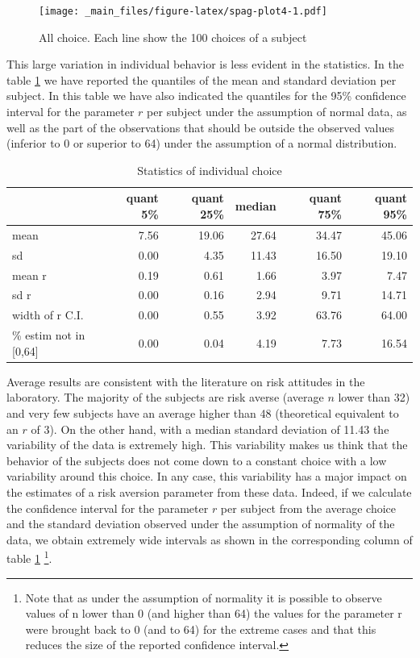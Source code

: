 \documentclass[
]{book}
\begin{document}
\begin{figure}
\centering
\texttt{[image: \_main\_files/figure-latex/spag-plot4-1.pdf]}
\caption{\label{fig:spag-plot4}All choice. Each line show the 100 choices of a subject}
\end{figure}

This large variation in individual behavior is less evident in the
statistics.
In the table \ref{tab:sum-stat-table4} we have reported the
quantiles of the mean and standard deviation per subject.
In this table we have also indicated the quantiles for the 95\% confidence
interval for the parameter \(r\) per subject under the assumption of normal data,
as well as the part of the observations that should be outside the observed
values (inferior to 0 or superior to 64) under the assumption of a normal
distribution.

\begin{table}

\caption{\label{tab:sum-stat-table4}Statistics of individual choice}
\centering
\begin{tabular}[t]{l|r|r|r|r|r}
\hline
  & quant 5\% & quant 25\% & median & quant 75\% & quant 95\%\\
\hline
mean & 7.56 & 19.06 & 27.64 & 34.47 & 45.06\\
\hline
sd & 0.00 & 4.35 & 11.43 & 16.50 & 19.10\\
\hline
mean r & 0.19 & 0.61 & 1.66 & 3.97 & 7.47\\
\hline
sd r & 0.00 & 0.16 & 2.94 & 9.71 & 14.71\\
\hline
width of r C.I. & 0.00 & 0.55 & 3.92 & 63.76 & 64.00\\
\hline
\% estim not in [0,64] & 0.00 & 0.04 & 4.19 & 7.73 & 16.54\\
\hline
\end{tabular}
\end{table}

Average results are consistent with
the literature on risk attitudes in the laboratory. The majority of the subjects
are risk averse (average \(n\) lower than 32) and very few subjects have an
average higher than 48 (theoretical equivalent to an \(r\) of 3). On the
other hand, with a median standard deviation of
11.43 the variability of the data is
extremely high. This variability makes us think that the behavior of the
subjects does not come down to a constant choice with a low variability
around this choice. In any case, this variability has a major impact on
the estimates of a risk aversion parameter from these data. Indeed, if we
calculate the confidence interval for the parameter \(r\) per subject from
the average choice and the standard deviation observed under the
assumption of normality of the data, we obtain extremely wide intervals
as shown in the corresponding column of table \ref{tab:sum-stat-table4} \footnote{Note that as under the assumption of normality it is possible to
  observe values of n lower than 0 (and higher than 64) the values for
  the parameter r were brought back to 0 (and to 64) for the extreme
  cases and that this reduces the size of the reported confidence
  interval.}.
\end{document}
